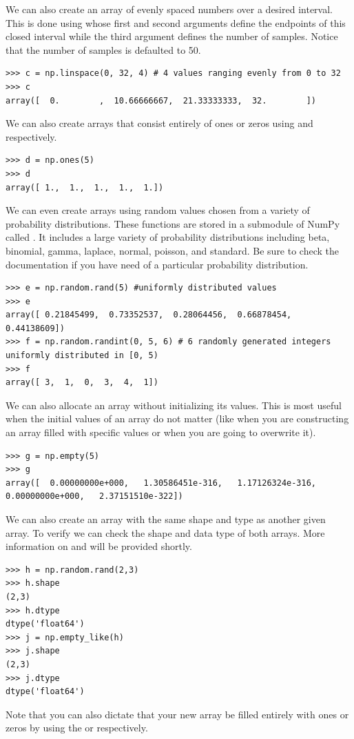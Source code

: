 We can also create an array of evenly spaced numbers over a desired interval.
This is done using  whose first
and second arguments define the endpoints of this closed interval while 
the third argument defines the number of samples. Notice that the number
of samples is defaulted to 50. 
\begin{lstlisting}
>>> c = np.linspace(0, 32, 4) # 4 values ranging evenly from 0 to 32 
>>> c
array([  0.        ,  10.66666667,  21.33333333,  32.        ])
\end{lstlisting} 


We can also create arrays that
consist entirely of ones or zeros using  and
 respectively. 
\begin{lstlisting}
>>> d = np.ones(5) 
>>> d
array([ 1.,  1.,  1.,  1.,  1.])
\end{lstlisting} 

We can even create arrays using random values chosen
from a variety of probability distributions. These functions are stored
in a submodule of NumPy called . It includes a large variety
of probability distributions including beta, binomial, gamma, laplace, 
normal, poisson, and standard. Be sure to check the documentation if 
you have need of a particular probability distribution. 
\begin{lstlisting}
>>> e = np.random.rand(5) #uniformly distributed values 
>>> e
array([ 0.21845499,  0.73352537,  0.28064456,  0.66878454,  0.44138609])
>>> f = np.random.randint(0, 5, 6) # 6 randomly generated integers uniformly distributed in [0, 5) 
>>> f
array([ 3,  1,  0,  3,  4,  1])

\end{lstlisting} 

We can also allocate an array without initializing its
values. This is most useful when the initial values of an
array do not matter (like when you are constructing an array filled with
specific values or when you are going to overwrite it).
\begin{lstlisting}
>>> g = np.empty(5) 
>>> g
array([  0.00000000e+000,   1.30586451e-316,   1.17126324e-316,
0.00000000e+000,   2.37151510e-322]) 
\end{lstlisting} 

We can also create an array with the same shape and type as another given array. 
To verify we can check the shape and data type of both arrays. More information
on  and  will be provided shortly.
\begin{lstlisting}
>>> h = np.random.rand(2,3) 
>>> h.shape
(2,3)
>>> h.dtype
dtype('float64')
>>> j = np.empty_like(h)
>>> j.shape
(2,3)
>>> j.dtype
dtype('float64')
\end{lstlisting} 
Note that you can also dictate that your new array be
filled entirely with ones or zeros by using the  or
 respectively.


